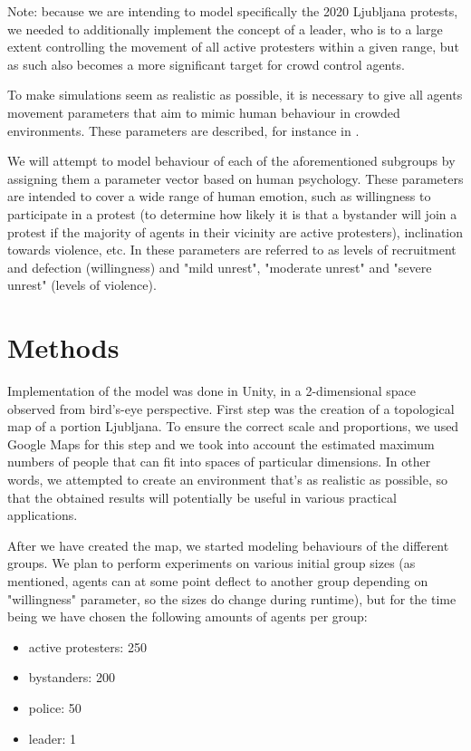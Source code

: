 \documentclass[9pt]{pnas-new}
\begin{document}
\bigskip
Note: because we are intending to model specifically the 2020 Ljubljana protests, we needed to additionally implement the concept of a leader, who is to a large extent controlling the movement of all active protesters within a given range, but as such also becomes a more significant target for crowd control agents. 

\bigskip
To make simulations seem as realistic as possible, it is necessary to give all agents movement parameters that aim to mimic human behaviour in crowded environments. These parameters are described, for instance in \cite{socialcrowdsimulation}. 

\bigskip
We will attempt to model behaviour of each of the aforementioned subgroups by assigning them a parameter vector based on human psychology. These parameters are intended to cover a wide range of human emotion, such as willingness to participate in a protest (to determine how likely it is that a bystander will join a protest if the majority of agents in their vicinity are active protesters), inclination towards violence, etc. In \cite{sportsriots} these parameters are referred to as levels of recruitment and defection (willingness) and "mild unrest", "moderate unrest" and "severe unrest" (levels of violence). 


\section*{Methods}

Implementation of the model was done in Unity, in a 2-dimensional space observed from bird's-eye perspective. First step was the creation of a topological map of a portion Ljubljana. To ensure the correct scale and proportions, we used Google Maps for this step and we took into account the estimated maximum numbers of people that can fit into spaces of particular dimensions. In other words, we attempted to create an environment that's as realistic as possible, so that the obtained results will potentially be useful in various practical applications. 

\bigskip
After we have created the map, we started modeling behaviours of the different groups. We plan to perform experiments on various initial group sizes (as mentioned, agents can at some point deflect to another group depending on "willingness" parameter, so the sizes do change during runtime), but for the time being we have chosen the following amounts of agents per group:
\begin{itemize}
    \item active protesters: 250
    \item bystanders: 200
    \item police: 50
    \item leader: 1
\end{itemize}
\end{document}
